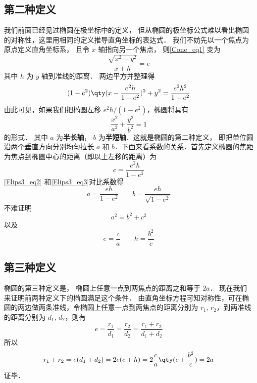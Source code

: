 

\subsection{第二种定义}
我们前面已经见过椭圆在极坐标中的定义， 但从椭圆的极坐标公式难以看出椭圆的对称性，这里用相同的定义推导直角坐标的表达式． 我们不妨先以一个焦点为原点定义直角坐标系， 且令 $x$ 轴指向另一个焦点， 则\autoref{Cone_eq1} 变为
\begin{equation}
\frac{\sqrt {x^2 + y^2} }{x + h} = e
\end{equation}
其中 $h$ 为 $y$ 轴到准线的距离． 两边平方并整理得
\begin{equation}\label{Elips3_eq2}
(1 - e^2) \qty( x - \frac{e^2 h}{1 - e^2} )^2 + y^2 = \frac{e^2 h^2}{1 - e^2}
\end{equation}
由此可见，如果我们把椭圆左移 $e^2 h/(1 - e^2)$，椭圆将具有
\begin{equation}\label{Elips3_eq3}
\frac{x^2}{a^2} + \frac{y^2}{b^2} = 1
\end{equation}
的形式． 其中 $a$ 为\textbf{半长轴}， $b$ 为\textbf{半短轴}．这就是椭圆的第二种定义， 即把单位圆沿两个垂直方向分别均匀拉长 $a$ 和 $b$．下面来看系数的关系．首先定义椭圆的焦距为焦点到椭圆中心的距离（即以上左移的距离）为
\begin{equation}
c = \frac{e^2 h}{1 - e^2}
\end{equation}
\autoref{Elips3_eq2} 和\autoref{Elips3_eq3}对比系数得
\begin{equation}
a = \frac{eh}{1 - e^2} \qquad b = \frac{eh}{\sqrt {1 - e^2} }
\end{equation}
不难证明
\begin{equation}
a^2 = b^2 + c^2
\end{equation}
以及
\begin{equation}
e = \frac{c}{a} \qquad h = \frac{b^2}{c}
\end{equation}

\subsection{第三种定义}
椭圆的第三种定义是， 椭圆上任意一点到两焦点的距离之和等于 $2a$． 现在我们来证明前两种定义下的椭圆满足这个条件． 由直角坐标方程可知对称性，可在椭圆的两边做两条准线，令椭圆上任意一点到两焦点的距离分别为 $r_1$, $r_2$，到两准线的距离分别为 $d_1$, $d_2$，则有
\begin{equation}
e = \frac{r_1}{d_1} = \frac{r_2}{d_2} = \frac{r_1 + r_2}{d_1 + d_2}
\end{equation}
所以
\begin{equation}
{r_1} + {r_2} = e(d_1+d_2) = 2e(c + h) = 2\frac{c}{a} \qty( c + \frac{b^2}{c} ) = 2a
\end{equation}
证毕．
